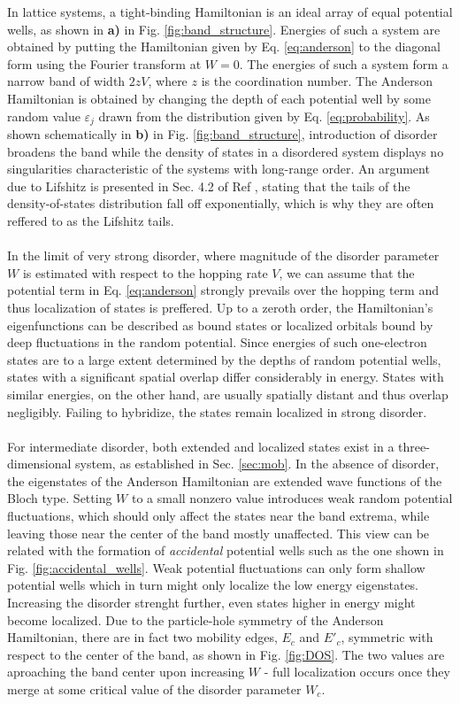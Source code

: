 \documentclass[10pt,a4paper]{article}
\begin{document}
\begin{minipage}[t]{0.56\textwidth} 
In lattice systems, a tight-binding Hamiltonian is an ideal array of equal potential wells, as shown in \textbf{a)} in Fig. \ref{fig:band_structure}. Energies of such a system are obtained by putting the Hamiltonian given by Eq. \eqref{eq:anderson} to the diagonal form using the Fourier transform at $W=0.$ The energies of such a system form a narrow band of width $2zV$, where $z$ is the coordination number. The Anderson Hamiltonian is obtained by changing the depth of each potential well by some random value $\varepsilon_j$ drawn from the distribution given by Eq. \eqref{eq:probability}. As shown schematically in \textbf{b)} in Fig. \ref{fig:band_structure}, introduction of disorder broadens the band while the density of states in a disordered system displays no singularities characteristic of the systems with long-range order. An argument due to Lifshitz is presented in Sec. 4.2 of Ref \cite{Kramer}, stating that the tails of the density-of-states distribution fall off exponentially, which is why they are often reffered to as the Lifshitz tails. \\\\
\noindent In the limit of very strong disorder, where magnitude of the disorder parameter $W$ is estimated with respect to the hopping rate $V$, we can assume that the potential term in Eq. \eqref{eq:anderson} strongly prevails over the hopping term and thus localization of states is preffered. Up to a zeroth order, the Hamiltonian's eigenfunctions can be described as bound states or localized orbitals bound by deep fluctuations in the random potential. Since energies of such one-electron states are to a large extent determined by the depths of random potential wells, states with a significant spatial overlap differ considerably in energy. States with similar energies, on the other hand, are usually spatially distant and thus overlap negligibly. Failing to hybridize,  the states remain localized in strong disorder. \\\\
\noindent For intermediate disorder, both extended and localized states exist in a three-dimensional system, as established in Sec. \ref{sec:mob}. In the absence of disorder, the eigenstates of the Anderson Hamiltonian are extended wave functions of the Bloch type. Setting $W$ to a small nonzero value introduces weak random potential fluctuations, which should only affect the states near the band extrema, while leaving those near the center of the band mostly unaffected. This view can be related with the formation of \emph{accidental} potential wells such as the one shown in Fig. \ref{fig:accidental_wells}. Weak potential fluctuations can only form shallow potential wells which in turn might only localize the low energy eigenstates. Increasing the disorder strenght further, even states higher in energy might become localized. Due to the particle-hole symmetry of the Anderson Hamiltonian, there are in fact two mobility edges, $E_c$ and $E'_c$, symmetric with respect to the center of the band, as shown in Fig. \ref{fig:DOS}. The two values are aproaching the band center upon increasing $W$ - full localization occurs once they merge at some critical value of the disorder parameter $W_c$. 

\end{minipage}
\end{document}
